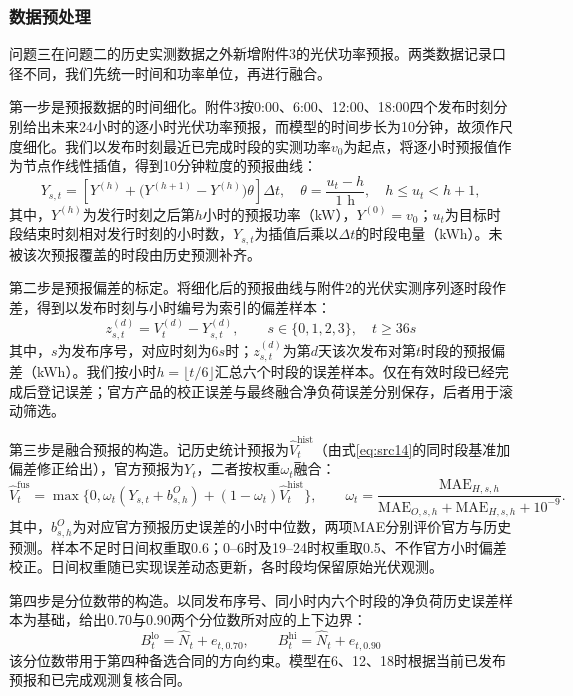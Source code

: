 \subsubsection{数据预处理}

问题三在问题二的历史实测数据之外新增附件3的光伏功率预报。两类数据记录口径不同，我们先统一时间和功率单位，再进行融合。

第一步是预报数据的时间细化。附件3按0:00、6:00、12:00、18:00四个发布时刻分别给出未来24小时的逐小时光伏功率预报，而模型的时间步长为10分钟，故须作尺度细化。我们以发布时刻最近已完成时段的实测功率$v_0$为起点，将逐小时预报值作为节点作线性插值，得到10分钟粒度的预报曲线：
\begin{equation}\label{eq:src30}
    Y_{s,t}=\left[Y^{(h)}+\bigl(Y^{(h+1)}-Y^{(h)}\bigr)\theta\right]\Delta t,
 \quad\theta=\frac{u_t-h}{1\text{ h}},\quad h\le u_t<h+1,
\end{equation}
其中，$Y^{(h)}$为发行时刻之后第$h$小时的预报功率（kW），$Y^{(0)}=v_0$；$u_t$为目标时段结束时刻相对发行时刻的小时数，$Y_{s,t}$为插值后乘以$\Delta t$的时段电量（kWh）。未被该次预报覆盖的时段由历史预测补齐。

第二步是预报偏差的标定。将细化后的预报曲线与附件2的光伏实测序列逐时段作差，得到以发布时刻与小时编号为索引的偏差样本：
\begin{equation}\label{eq:src31}
    z_{s,t}^{(d)}=V_t^{(d)}-Y_{s,t}^{(d)},\qquad s\in\{0,1,2,3\},\quad t\ge36s
\end{equation}
其中，$s$为发布序号，对应时刻为$6s$时；$z_{s,t}^{(d)}$为第$d$天该次发布对第$t$时段的预报偏差（kWh）。我们按小时$h=\lfloor t/6\rfloor$汇总六个时段的误差样本。仅在有效时段已经完成后登记误差；官方产品的校正误差与最终融合净负荷误差分别保存，后者用于滚动筛选。

第三步是融合预报的构造。记历史统计预报为$\hat{V}_t^{\text{hist}}$（由式\eqref{eq:src14}的同时段基准加偏差修正给出），官方预报为$Y_t$，二者按权重$\omega_t$融合：
\begin{equation}\label{eq:src32}
    \hat V_t^{\mathrm{fus}}=\max\{0,\omega_t(Y_{s,t}+b^O_{s,h})+(1-\omega_t)\hat V_t^{\mathrm{hist}}\},\qquad
 \omega_t=\frac{\mathrm{MAE}_{H,s,h}}{\mathrm{MAE}_{O,s,h}+\mathrm{MAE}_{H,s,h}+10^{-9}}.
\end{equation}
其中，$b^O_{s,h}$为对应官方预报历史误差的小时中位数，两项MAE分别评价官方与历史预测。样本不足时日间权重取0.6；0--6时及19--24时权重取0.5、不作官方小时偏差校正。日间权重随已实现误差动态更新，各时段均保留原始光伏观测。

第四步是分位数带的构造。以同发布序号、同小时内六个时段的净负荷历史误差样本为基础，给出0.70与0.90两个分位数所对应的上下边界：
\begin{equation}\label{eq:src33}
    B_{t}^{\text{lo}}=\hat{N}_{t}+e_{t,0.70},\qquad B_{t}^{\text{hi}}=\hat{N}_{t}+e_{t,0.90}
\end{equation}
该分位数带用于第四种备选合同的方向约束。模型在6、12、18时根据当前已发布预报和已完成观测复核合同。

